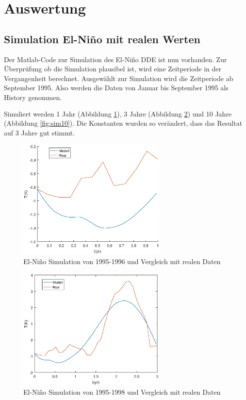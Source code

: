 \section{Auswertung}
\subsection{Simulation El-Niño mit realen Werten}
Der Matlab-Code zur Simulation des El-Niño DDE ist nun vorhanden.
Zur Überprüfung ob die Simulation plausibel ist, wird eine Zeitperiode in der Vergangenheit berechnet.
Ausgewählt zur Simulation wird die Zeitperiode ab September 1995. 
Also werden die Daten von Januar bis September 1995 als History genommen.

Simuliert werden 1 Jahr (Abbildung \ref{fig:sim1}), 3 Jahre (Abbildung \ref{fig:sim3}) und 10 Jahre (Abbildung \ref{fig:sim10}). 
Die Konstanten wurden so verändert, dass das Resultat auf 3 Jahre gut stimmt.
\begin{figure}
	\centering
	\includegraphics[width=0.66\textwidth,height=0.33\textheight]{verzoegert/inp/figures/sim_1.eps}
	\caption{El-Niño Simulation von 1995-1996 und Vergleich mit realen Daten}
	\label{fig:sim1}
\end{figure}
\begin{figure}
	\centering
	\includegraphics[width=0.66\textwidth,height=0.33\textheight]{verzoegert/inp/figures/sim_3.eps}
	\caption{El-Niño Simulation von 1995-1998 und Vergleich mit realen Daten}
	\label{fig:sim3}
\end{figure}
